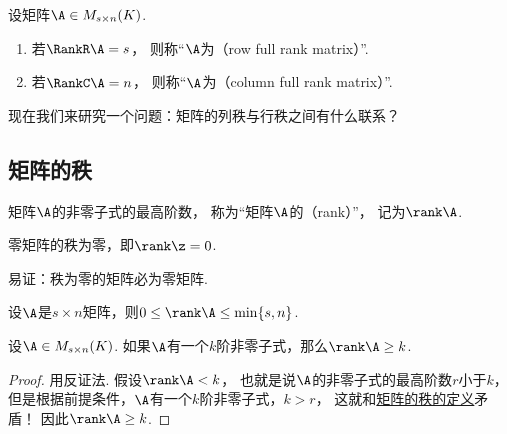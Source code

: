 \begin{definition}
设矩阵\(\A \in M_{s \times n}(K)\).
\begin{enumerate}
	\item 若\(\RankR\A = s\)，
	则称“\(\A\)为（row full rank matrix）”.
	\item 若\(\RankC\A = n\)，
	则称“\(\A\)为（column full rank matrix）”.
\end{enumerate}
\end{definition}

现在我们来研究一个问题：矩阵的列秩与行秩之间有什么联系？

\subsection{矩阵的秩}
\begin{definition}\label{definition:线性方程组.矩阵的秩的定义}
矩阵\(\A\)的非零子式的最高阶数，
称为“矩阵\(\A\)的（rank）”，
记为\(\rank\A\).
\end{definition}

\begin{property}\label{theorem:线性方程组.矩阵的秩的性质1}
零矩阵的秩为零，即\(\rank\z = 0\).
\end{property}
\begin{remark}
易证：秩为零的矩阵必为零矩阵.
\end{remark}

\begin{property}\label{theorem:线性方程组.矩阵的秩的性质2}
设\(\A\)是\(s \times n\)矩阵，则\(0 \leq \rank\A \leq \min\{s,n\}\).
\end{property}

\begin{theorem}
设\(\A\in M_{s \times n}(K)\).
如果\(\A\)有一个\(k\)阶非零子式，那么\(\rank\A\geq k\).
\begin{proof}
用反证法.
假设\(\rank\A<k\)，
也就是说\(\A\)的非零子式的最高阶数\(r\)小于\(k\)，
但是根据前提条件，\(\A\)有一个\(k\)阶非零子式，\(k>r\)，
这就和\hyperref[definition:线性方程组.矩阵的秩的定义]{矩阵的秩的定义}矛盾！
因此\(\rank\A\geq k\).
\end{proof}
\end{theorem}

